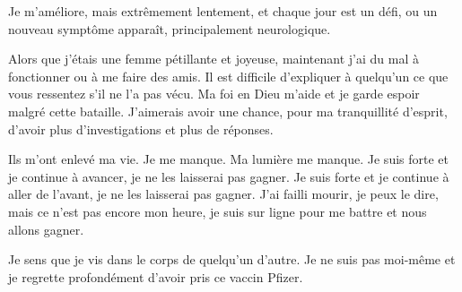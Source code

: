 Je m'améliore, mais extrêmement lentement, et chaque jour est un défi, ou un
nouveau symptôme apparaît, principalement neurologique.

Alors que j'étais une femme pétillante et joyeuse, maintenant j'ai du mal à
fonctionner ou à me faire des amis. Il est difficile d'expliquer à quelqu'un ce
que vous ressentez s'il ne l'a pas vécu. Ma foi en Dieu m'aide et je garde
espoir malgré cette bataille. J'aimerais avoir une chance, pour ma tranquillité
d'esprit, d'avoir plus d'investigations et plus de réponses.

Ils m'ont enlevé ma vie. Je me manque. Ma lumière me manque. Je suis forte et je
continue à avancer, je ne les laisserai pas gagner. Je suis forte et je continue
à aller de l'avant, je ne les laisserai pas gagner. J'ai failli mourir, je peux
le dire, mais ce n'est pas encore mon heure, je suis sur ligne pour me battre et
nous allons gagner.

Je sens que je vis dans le corps de quelqu'un d'autre. Je ne suis pas moi-même
et je regrette profondément d'avoir pris ce vaccin Pfizer.
